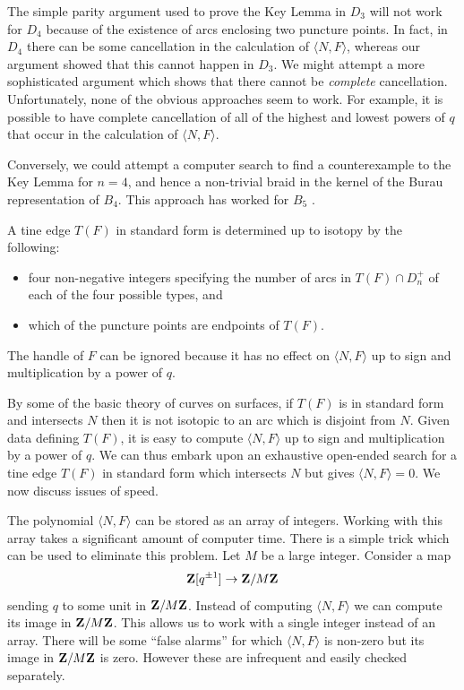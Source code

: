 \documentclass[10pt]{amsart}
\theoremstyle{plain}
\theoremstyle{definition}
\newcommand{\Z}{{\bf{Z}}}
\begin{document}
The simple parity argument used to prove the Key Lemma in $D_3$
will not work for $D_4$ because of
the existence of arcs enclosing two puncture points.
In fact, in $D_4$ there can be some cancellation
in the calculation of $\langle N,F \rangle$,
whereas our argument showed that this cannot happen in $D_3$.
We might attempt a more sophisticated argument
which shows that there cannot be {\em complete} cancellation.
Unfortunately, none of the obvious approaches seem to work.
For example, it is possible to have complete cancellation of
all of the highest and lowest powers of $q$
that occur in the calculation of $\langle N,F \rangle$.

Conversely, we could attempt a computer search
to find a counterexample to the Key Lemma for $n=4$,
and hence a non-trivial braid in the kernel of
the Burau representation of $B_4$.
This approach has worked for $B_5$ \cite{bigelow:b5}.

A tine edge $T(F)$ in standard form
is determined up to isotopy by the following:
\begin{itemize}
\item
four non-negative integers
specifying the number of arcs in $T(F) \cap D_n^+$
of each of the four possible types, and
\item
which of the puncture points are endpoints of $T(F)$.
\end{itemize}
The handle of $F$ can be ignored
because it has no effect on $\langle N,F \rangle$
up to sign and multiplication by a power of $q$.

By some of the basic theory of curves on surfaces,
if $T(F)$ is in standard form
and intersects $N$
then it is not isotopic to an arc which is disjoint from $N$.
Given data defining $T(F)$,
it is easy to compute $\langle N,F \rangle$
up to sign and multiplication by a power of $q$.
We can thus embark upon an exhaustive open-ended search
for a tine edge $T(F)$ in standard form
which intersects $N$ but gives $\langle N,F \rangle = 0$.
We now discuss issues of speed.

The polynomial $\langle N,F \rangle$ can be stored as
an array of integers.
Working with this array takes a significant amount of computer time.
There is a simple trick which can be used to eliminate this problem.
Let $M$ be a large integer.
Consider a map
$$\Z[q^{\pm 1}] \rightarrow \Z/M\Z$$
sending $q$ to some unit in $\Z/M\Z$.
Instead of computing $\langle N,F \rangle$
we can compute its image in $\Z/M\Z$.
This allows us to work with a single integer instead of an array.
There will be some ``false alarms''
for which $\langle N,F \rangle$ is non-zero
but its image in $\Z/M\Z$ is zero.
However these are infrequent and easily checked separately.
\end{document}
